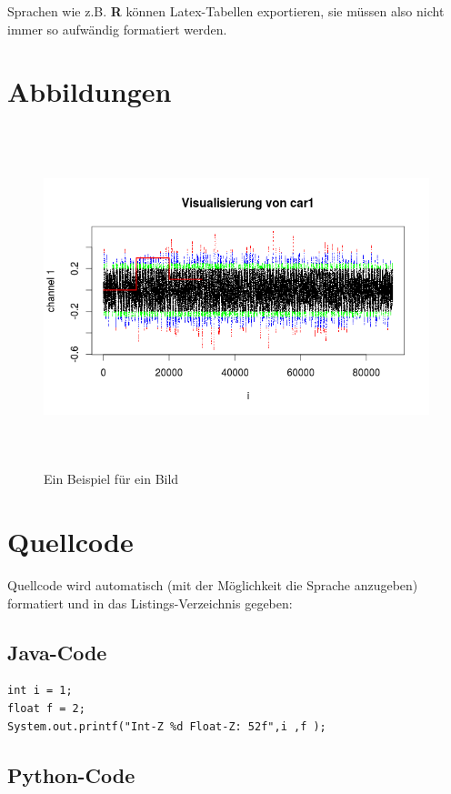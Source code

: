 Sprachen wie z.B. \textbf{R} können Latex-Tabellen exportieren, sie müssen also nicht immer so aufwändig formatiert werden.			


\section{Abbildungen}

 \begin{figure}[H]
 	\hspace*{-1.5cm}
 	\includegraphics[width=512pt,height=280pt]{figures/bsp.png}
 	\caption{Ein Beispiel für ein Bild}
 	\label{bild:beispiel}
 \end{figure}
 
 
\section{Quellcode}

Quellcode wird automatisch (mit der Möglichkeit die Sprache anzugeben) formatiert und in das Listings-Verzeichnis gegeben:

\subsection{Java-Code}

\begin{lstlisting}[style=Java, caption={Java-Beispiel}, captionpos=b]
int i = 1;
float f = 2;
System.out.printf("Int-Z %d Float-Z: 52f",i ,f );
\end{lstlisting} 


\subsection{Python-Code}
 
